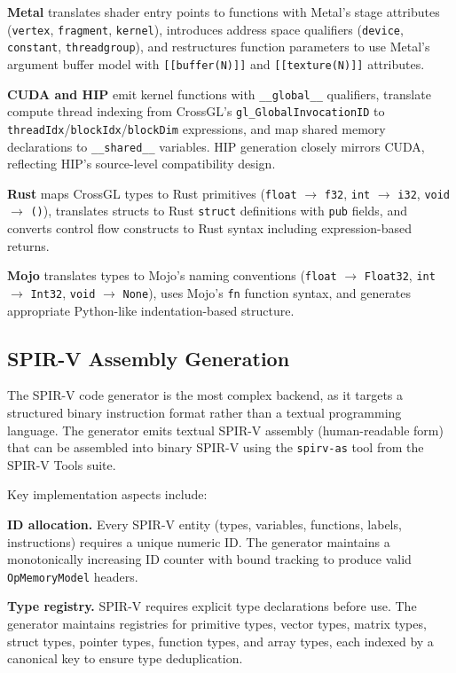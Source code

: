 \documentclass{svproc}
\begin{document}
\textbf{Metal} translates shader entry points to functions with Metal's stage attributes (\texttt{vertex}, \texttt{fragment}, \texttt{kernel}), introduces address space qualifiers (\texttt{device}, \texttt{constant}, \texttt{threadgroup}), and restructures function parameters to use Metal's argument buffer model with \texttt{[[buffer(N)]]} and \texttt{[[texture(N)]]} attributes.

\textbf{CUDA and HIP} emit kernel functions with \texttt{\_\_global\_\_} qualifiers, translate compute thread indexing from CrossGL's \texttt{gl\_GlobalInvocationID} to \texttt{threadIdx}/\texttt{blockIdx}/\texttt{blockDim} expressions, and map shared memory declarations to \texttt{\_\_shared\_\_} variables. HIP generation closely mirrors CUDA, reflecting HIP's source-level compatibility design.

\textbf{Rust} maps CrossGL types to Rust primitives (\texttt{float} $\rightarrow$ \texttt{f32}, \texttt{int} $\rightarrow$ \texttt{i32}, \texttt{void} $\rightarrow$ \texttt{()}), translates structs to Rust \texttt{struct} definitions with \texttt{pub} fields, and converts control flow constructs to Rust syntax including expression-based returns.

\textbf{Mojo} translates types to Mojo's naming conventions (\texttt{float} $\rightarrow$ \texttt{Float32}, \texttt{int} $\rightarrow$ \texttt{Int32}, \texttt{void} $\rightarrow$ \texttt{None}), uses Mojo's \texttt{fn} function syntax, and generates appropriate Python-like indentation-based structure.

\subsection{SPIR-V Assembly Generation}

The SPIR-V code generator is the most complex backend, as it targets a structured binary instruction format rather than a textual programming language. The generator emits textual SPIR-V assembly (human-readable form) that can be assembled into binary SPIR-V using the \texttt{spirv-as} tool from the SPIR-V Tools suite.

Key implementation aspects include:

\textbf{ID allocation.} Every SPIR-V entity (types, variables, functions, labels, instructions) requires a unique numeric ID. The generator maintains a monotonically increasing ID counter with bound tracking to produce valid \texttt{OpMemoryModel} headers.

\textbf{Type registry.} SPIR-V requires explicit type declarations before use. The generator maintains registries for primitive types, vector types, matrix types, struct types, pointer types, function types, and array types, each indexed by a canonical key to ensure type deduplication.
\end{document}
